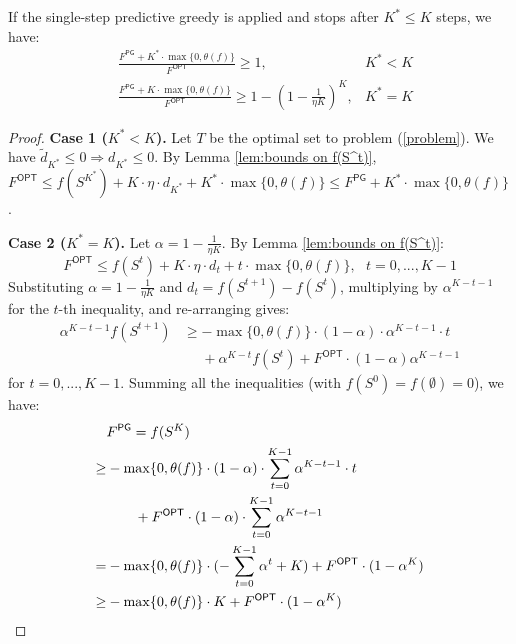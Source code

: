 \begin{theorem}  \label{thm:bounds-on-SPG}
If the single-step predictive greedy is applied and stops after $K^* \leq K$ steps, we have:
\begin{align*}
& \frac{F^{\textsf{PG}} + K^* \cdot \max \{ 0, \theta(f) \}}{F^{\textsf{OPT}}} \geq 1,           & K^* < K\\
& \frac{F^{\textsf{PG}} + K \cdot \max \{ 0, \theta(f) \}}{F^{\textsf{OPT}}} \geq 1 - (1 - \frac{1}{\eta K})^K,  & K^* = K
\end{align*}
\end{theorem}
\begin{proof}
\textbf{Case 1 ($K^* < K$).} Let $T$ be the optimal set to problem (\ref{problem}). We have $\tilde{d}_{K^*} \leq 0 \Rightarrow {d}_{K^*} \leq 0$. By Lemma \ref{lem:bounds on f(S^t)}, $F^{\textsf{OPT}} \leq f(S^{K^*}) + K \cdot \eta \cdot d_{K^*} + K^* \cdot \max \{ 0, \theta(f) \} \leq F^{\textsf{PG}} + K^* \cdot \max \{ 0, \theta(f) \}$.

\textbf{Case 2 ($K^* = K$).} Let $\alpha = 1 - \frac{1}{\eta K}$. By Lemma \ref{lem:bounds on f(S^t)}:
\[ F^{\textsf{OPT}} \leq f(S^t) + K \cdot \eta \cdot d_{t} + t \cdot \max \{ 0, \theta(f) \}, ~~~ t = 0, ..., K-1 \]
Substituting $\alpha = 1 - \frac{1}{\eta K}$ and $d_t = f(S^{t+1}) - f(S^t)$, multiplying by $\alpha^{K-t-1}$ for the $t$-th inequality, and re-arranging gives:
\begin{align*}
\alpha^{K-t-1} f(S^{t+1}) &\geq - {\max \{ 0, \theta(f) \}} \cdot (1 - \alpha) \cdot \alpha^{K-t-1} \cdot t  \\ &~~~~~~ + \alpha^{K-t} f(S^t) + {F^{\textsf{OPT}}} \cdot (1 - \alpha) \alpha^{K-t-1}
\end{align*}
for $t = 0, ..., K-1$. Summing all the inequalities (with $f(S^0) = f(\emptyset) = 0$), we have:
\begin{align*}
    &F^{\textsf{PG}} = f(S^K) \\
    \geq& - {\max \{ 0, \theta(f) \}} \cdot (1 - \alpha) \cdot \sum_{t=0}^{K-1}{\alpha^{K-t-1} \cdot t}  \\ 
    &~~~~~~+ {F^{\textsf{OPT}}} \cdot (1 - \alpha) \cdot \sum_{t=0}^{K-1}{\alpha^{K-t-1}} \\
    =& - {\max \{ 0, \theta(f) \}} \cdot (-\sum_{t=0}^{K-1}{\alpha^t} + K) + F^{\textsf{OPT}} \cdot (1 - \alpha^K) \\
    \geq& - {\max \{ 0, \theta(f) \}} \cdot K + F^{\textsf{OPT}} \cdot (1 - \alpha^K) \qedhere
\end{align*}
\end{proof}


